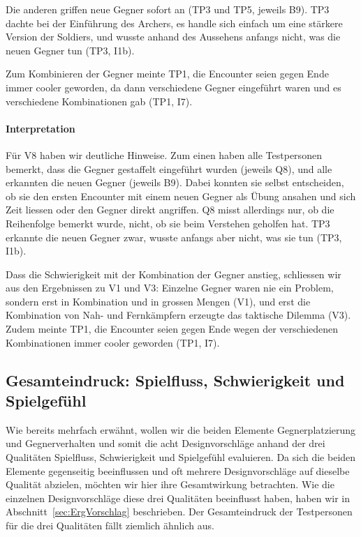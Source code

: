 \documentclass[../Main.tex]{subfiles}
\begin{document}
Die anderen griffen neue Gegner sofort an (TP3 und TP5, jeweils B9). TP3 dachte bei der Einführung des Archers, es handle sich einfach um eine stärkere Version der Soldiers, und wusste anhand des Aussehens anfangs nicht, was die neuen Gegner tun (TP3, I1b).

Zum Kombinieren der Gegner meinte TP1, die Encounter seien gegen Ende immer cooler geworden, da dann verschiedene Gegner eingeführt waren und es verschiedene Kombinationen gab (TP1, I7).

\paragraph{Interpretation}
Für V8 haben wir deutliche Hinweise. Zum einen haben alle Testpersonen bemerkt, dass die Gegner gestaffelt eingeführt wurden (jeweils Q8), und alle erkannten die neuen Gegner (jeweils B9). Dabei konnten sie selbst entscheiden, ob sie den ersten Encounter mit einem neuen Gegner als Übung ansahen und sich Zeit liessen oder den Gegner direkt angriffen. Q8 misst allerdings nur, ob die Reihenfolge bemerkt wurde, nicht, ob sie beim Verstehen geholfen hat. TP3 erkannte die neuen Gegner zwar, wusste anfangs aber nicht, was sie tun (TP3, I1b).

Dass die Schwierigkeit mit der Kombination der Gegner anstieg, schliessen wir aus den Ergebnissen zu V1 und V3: Einzelne Gegner waren nie ein Problem, sondern erst in Kombination und in grossen Mengen (V1), und erst die Kombination von Nah- und Fernkämpfern erzeugte das taktische Dilemma (V3). Zudem meinte TP1, die Encounter seien gegen Ende wegen der verschiedenen Kombinationen immer cooler geworden (TP1, I7).

\subsection{Gesamteindruck: Spielfluss, Schwierigkeit und Spielgefühl} \label{sec:Gesamteindruck} \label{sec:ErgAllgemein}

Wie bereits mehrfach erwähnt, wollen wir die beiden Elemente Gegnerplatzierung und Gegnerverhalten und somit die acht Designvorschläge anhand der drei Qualitäten Spielfluss, Schwierigkeit und Spielgefühl evaluieren. Da sich die beiden Elemente gegenseitig beeinflussen und oft mehrere Designvorschläge auf dieselbe Qualität abzielen, möchten wir hier ihre Gesamtwirkung betrachten. Wie die einzelnen Designvorschläge diese drei Qualitäten beeinflusst haben, haben wir in Abschnitt~\ref{sec:ErgVorschlag} beschrieben. Der Gesamteindruck der Testpersonen für die drei Qualitäten fällt ziemlich ähnlich aus.
\end{document}
